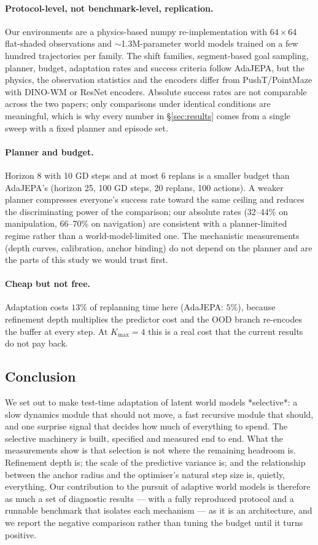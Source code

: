 \paragraph{Protocol-level, not benchmark-level, replication.} Our environments are a
physics-based numpy re-implementation with $64\times64$ flat-shaded observations and
$\sim$1.3M-parameter world models trained on a few hundred trajectories per family. The shift
families, segment-based goal sampling, planner, budget, adaptation rates and success criteria
follow AdaJEPA, but the physics, the observation statistics and the encoders differ from
PushT/PointMaze with DINO-WM or ResNet encoders. Absolute success rates are not comparable
across the two papers; only comparisons under identical conditions are meaningful, which is why
every number in \S\ref{sec:results} comes from a single sweep with a fixed planner and episode
set.

\paragraph{Planner and budget.} Horizon 8 with 10 GD steps and at most 6 replans is a smaller
budget than AdaJEPA's (horizon 25, 100 GD steps, 20 replans, 100 actions). A weaker planner
compresses everyone's success rate toward the same ceiling and reduces the discriminating power
of the comparison; our absolute rates (32--44\% on manipulation, 66--70\% on navigation) are
consistent with a planner-limited regime rather than a world-model-limited one. The
mechanistic measurements (depth curves, calibration, anchor binding) do not depend on the
planner and are the parts of this study we would trust first.

\paragraph{Cheap but not free.} Adaptation costs $13\%$ of replanning time here (AdaJEPA: $5\%$),
because refinement depth multiplies the predictor cost and the OOD branch re-encodes the buffer
at every step. At $K_{\max}=4$ this is a real cost that the current results do not pay back.

\subsection{Conclusion}

We set out to make test-time adaptation of latent world models *selective*: a slow dynamics
module that should not move, a fast recursive module that should, and one surprise signal that
decides how much of everything to spend. The selective machinery is built, specified and
measured end to end. What the measurements show is that selection is not where the remaining
headroom is. Refinement depth is; the scale of the predictive variance is; and the relationship
between the anchor radius and the optimiser's natural step size is, quietly, everything. Our
contribution to the pursuit of adaptive world models is therefore as much a set of diagnostic
results --- with a fully reproduced protocol and a runnable benchmark that isolates each
mechanism --- as it is an architecture, and we report the negative comparison rather than
tuning the budget until it turns positive.

